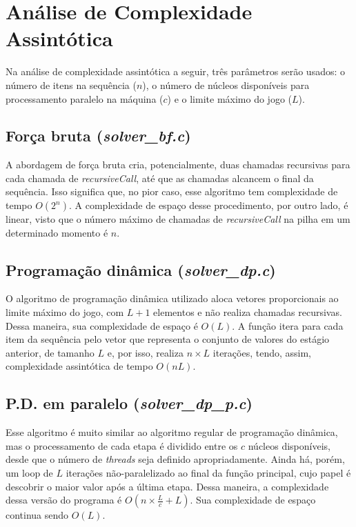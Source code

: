 \documentclass[10pt,a4paper]{article}
\numberwithin{equation}{section}
\begin{document}
\section{Análise de Complexidade Assintótica}

Na análise de complexidade assintótica a seguir, três parâmetros serão usados: o número de itens na sequência ($n$), o número de núcleos disponíveis para processamento paralelo na máquina ($c$) e o limite máximo do jogo ($L$).

\subsection{Força bruta (\emph{solver\_bf.c})}

A abordagem de força bruta cria, potencialmente, duas chamadas recursivas para cada chamada de \emph{recursiveCall}, até que as chamadas alcancem o final da sequência. Isso significa que, no pior caso, esse algoritmo tem complexidade de tempo $O(2^n)$. A complexidade de espaço desse procedimento, por outro lado, é linear, visto que o número máximo de chamadas de \emph{recursiveCall} na pilha em um determinado momento é $n$.

\subsection{Programação dinâmica (\emph{solver\_dp.c})}

O algoritmo de programação dinâmica utilizado aloca vetores proporcionais ao limite máximo do jogo, com $L + 1$ elementos e não realiza chamadas recursivas. Dessa maneira, sua complexidade de espaço é $O(L)$. A função itera para cada item da sequência pelo vetor que representa o conjunto de valores do estágio anterior, de tamanho $L$ e, por isso, realiza $n \times L$ iterações, tendo, assim, complexidade assintótica de tempo $O(nL)$.

\subsection{P.D. em paralelo (\emph{solver\_dp\_p.c})}

Esse algoritmo é muito similar ao algoritmo regular de programação dinâmica, mas o processamento de cada etapa é dividido entre os $c$ núcleos disponíveis, desde que o número de \emph{threads} seja definido apropriadamente. Ainda há, porém, um loop de $L$ iterações não-paralelizado ao final da função principal, cujo papel é descobrir o maior valor após a última etapa. Dessa maneira, a complexidade dessa versão do programa é $O(n \times \frac{L}{c} + L)$. Sua complexidade de espaço continua sendo $O(L)$.
\end{document}
